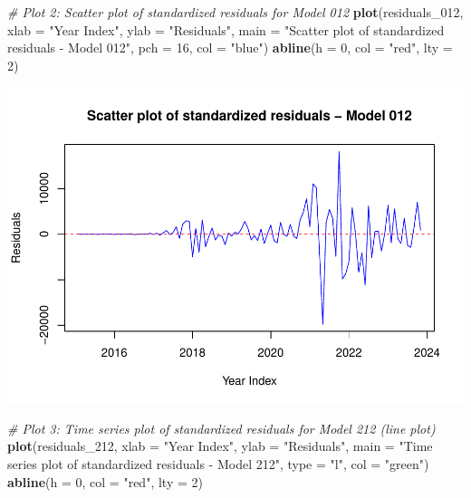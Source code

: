 \documentclass[
]{book}
\newenvironment{Shaded}{\begin{snugshade}}{\end{snugshade}}
\newcommand{\AttributeTok}[1]{\textcolor[rgb]{0.13,0.29,0.53}{#1}}
\newcommand{\CommentTok}[1]{\textcolor[rgb]{0.56,0.35,0.01}{\textit{#1}}}
\newcommand{\DecValTok}[1]{\textcolor[rgb]{0.00,0.00,0.81}{#1}}
\newcommand{\FunctionTok}[1]{\textcolor[rgb]{0.13,0.29,0.53}{\textbf{#1}}}
\newcommand{\NormalTok}[1]{#1}
\newcommand{\StringTok}[1]{\textcolor[rgb]{0.31,0.60,0.02}{#1}}
\begin{document}
\begin{Shaded}
\begin{Highlighting}[]
\CommentTok{\# Plot 2: Scatter plot of standardized residuals for Model 012}
\FunctionTok{plot}\NormalTok{(residuals\_012,}
     \AttributeTok{xlab =} \StringTok{"Year Index"}\NormalTok{, }\AttributeTok{ylab =} \StringTok{"Residuals"}\NormalTok{,}
     \AttributeTok{main =} \StringTok{"Scatter plot of standardized residuals {-} Model 012"}\NormalTok{,}
     \AttributeTok{pch =} \DecValTok{16}\NormalTok{, }\AttributeTok{col =} \StringTok{"blue"}\NormalTok{)}
\FunctionTok{abline}\NormalTok{(}\AttributeTok{h =} \DecValTok{0}\NormalTok{, }\AttributeTok{col =} \StringTok{"red"}\NormalTok{, }\AttributeTok{lty =} \DecValTok{2}\NormalTok{)}
\end{Highlighting}
\end{Shaded}

\includegraphics{bookdown-demo_files/figure-latex/unnamed-chunk-48-2.pdf}

\begin{Shaded}
\begin{Highlighting}[]
\CommentTok{\# Plot 3: Time series plot of standardized residuals for Model 212 (line plot)}
\FunctionTok{plot}\NormalTok{(residuals\_212,}
     \AttributeTok{xlab =} \StringTok{"Year Index"}\NormalTok{, }\AttributeTok{ylab =} \StringTok{"Residuals"}\NormalTok{,}
     \AttributeTok{main =} \StringTok{"Time series plot of standardized residuals {-} Model 212"}\NormalTok{,}
     \AttributeTok{type =} \StringTok{"l"}\NormalTok{, }\AttributeTok{col =} \StringTok{"green"}\NormalTok{)}
\FunctionTok{abline}\NormalTok{(}\AttributeTok{h =} \DecValTok{0}\NormalTok{, }\AttributeTok{col =} \StringTok{"red"}\NormalTok{, }\AttributeTok{lty =} \DecValTok{2}\NormalTok{)}
\end{Highlighting}
\end{Shaded}
\end{document}
